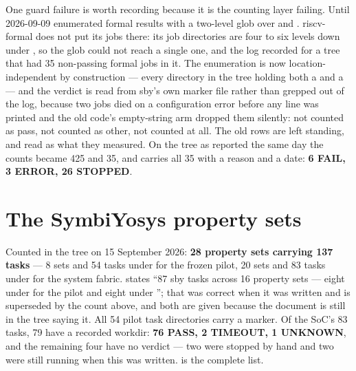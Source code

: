 One guard failure is worth recording because it is the counting layer
failing. Until 2026-09-09  enumerated formal
results with a two-level glob over  and
. riscv-formal does not put its jobs there: its job
directories are four to six levels down under , so the
glob could not reach a single one, and the log recorded
 for a tree that had 35
non-passing formal jobs in it. The enumeration is now
location-independent by construction --- every directory in the tree
holding both a  and a  --- and the
verdict is read from sby's own marker file rather than grepped out of
the log, because two jobs died on a configuration error before any
 line was printed and the old code's empty-string arm dropped
them silently: not counted as pass, not counted as other, not counted at
all. The old rows are left standing, and read as what they measured. On
the tree as reported the same day the counts became 425 and 35, and
 carries all 35 with a reason and a date:
\textbf{6 FAIL, 3 ERROR, 26 STOPPED}.

\section{The SymbiYosys property sets}
\label{sec:verif-sby}

Counted in the tree on 15 September 2026: \textbf{28 property sets
carrying 137 tasks} --- 8 sets and 54 tasks under  for the
frozen pilot, 20 sets and 83 tasks under  for the
system fabric.  states ``87 sby tasks across 16
property sets --- eight under  for the pilot and eight
under ''; that was correct when it was written and
is superseded by the count above, and both are given because the
document is still in the tree saying it. All 54 pilot task directories
carry a  marker. Of the SoC's 83 tasks, 79 have a recorded
workdir: \textbf{76 PASS, 2 TIMEOUT, 1 UNKNOWN}, and the remaining four
have no verdict --- two were stopped by hand and two were still running
when this was written.  is the complete list.

